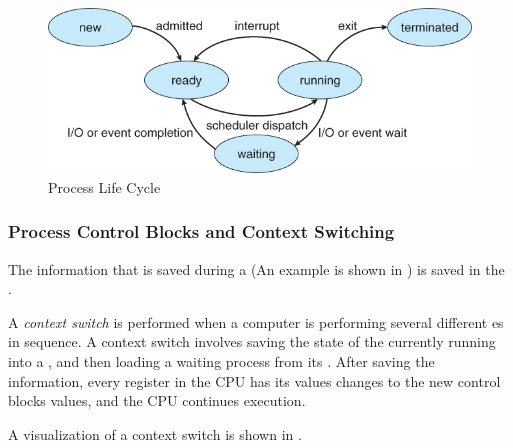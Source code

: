 \begin{figure}[h!tbp]
  \centering
  \includegraphics[scale=0.85]{./Drawings/EDAF35-Operating_Systems/Process_Life_Cycle.jpg}
  \caption{Process Life Cycle}
  \label{fig:Process_Life_Cycle}
\end{figure}

\subsubsection{Process Control Blocks and Context Switching}\label{subsubsec:PCBs_Context_Switching}
The information that is saved during a  (An example is shown in ) is saved in the .

\begin{definition}\label{def:Context_Switch}
  A \emph{context switch} is performed when a computer is performing several different es in sequence.
  A context switch involves saving the state of the currently running  into a , and then loading a waiting process from its .
  After saving the information, every register in the CPU has its values changes to the new control blocks values, and the CPU continues execution.

  A visualization of a context switch is shown in .
\end{definition}


